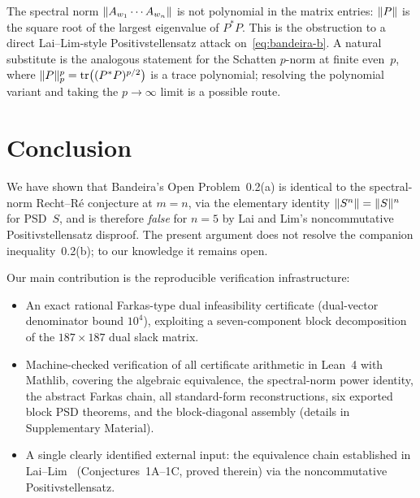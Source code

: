 \begin{remark}
The spectral norm $\lVert A_{w_1}\cdots A_{w_n}\rVert$ is not polynomial
in the matrix entries: $\lVert P\rVert$ is the square root of the largest
eigenvalue of $P^{*}P$.  This is the obstruction to a direct
Lai--Lim-style Positivstellensatz attack on~\eqref{eq:bandeira-b}.
A natural substitute is the analogous statement for the Schatten
$p$-norm at finite even~$p$, where
$\lVert P\rVert_{p}^{p}=\operatorname{tr}\bigl((P^{*}P)^{p/2}\bigr)$ is a trace
polynomial; resolving the polynomial variant and taking the
$p\to\infty$ limit is a possible route.
\end{remark}

\section{Conclusion}\label{sec:concl}

We have shown that Bandeira's Open Problem~0.2(a) is identical to the
spectral-norm Recht--R\'e conjecture at $m=n$, via the elementary
identity $\lVert S^n\rVert=\lVert S\rVert^n$ for PSD~$S$, and is therefore
\emph{false} for $n=5$ by Lai and Lim's noncommutative
Positivstellensatz disproof.  The present argument does not resolve
the companion inequality~0.2(b); to our knowledge it remains open.

Our main contribution is the reproducible verification
infrastructure:
\begin{itemize}[itemsep=3pt]
  \item An exact rational Farkas-type dual infeasibility certificate
    (dual-vector denominator bound $10^4$), exploiting a
    seven-component block decomposition of the $187\times 187$ dual
    slack matrix.
  \item Machine-checked verification of all certificate arithmetic
    in Lean~4 with Mathlib, covering the algebraic equivalence,
    the spectral-norm power identity, the abstract Farkas chain,
    all standard-form reconstructions, six exported block PSD
    theorems, and the block-diagonal assembly
    (details in Supplementary Material).
  \item A single clearly identified external input: the equivalence
    chain established in Lai--Lim~\cite[\S\,3]{LaiLim2020}
    (Conjectures~1A--1C, proved therein) via the noncommutative
    Positivstellensatz.
\end{itemize}

